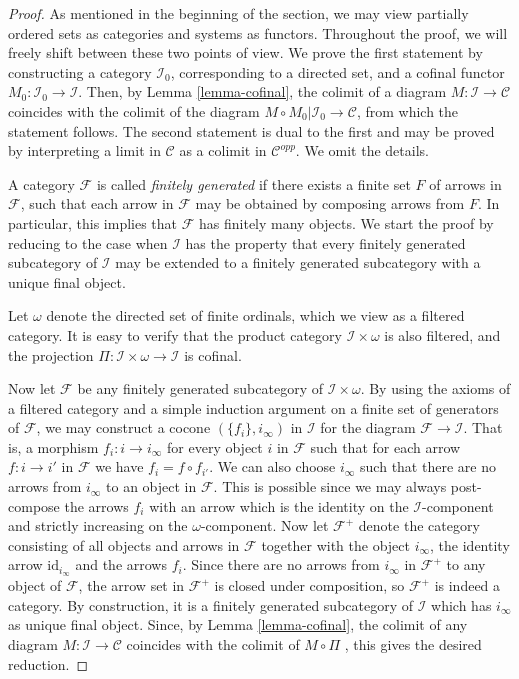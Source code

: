 \begin{proof}
As mentioned in the beginning of the section, we may view
partially ordered sets as categories and systems as functors.
Throughout the proof, we will freely shift between these two points
of view.
We prove the first statement by constructing a category
$\mathcal{I}_0$, corresponding to a directed set, and a cofinal
functor $M_0 : \mathcal{I}_0 \to \mathcal{I}$. Then, by
Lemma \ref{lemma-cofinal}, the colimit of a diagram
$M : \mathcal{I} \to \mathcal{C}$ coincides with the
colimit of the diagram $M \circ M_0 | \mathcal{I}_0 \to \mathcal{C}$,
from which the statement follows. The second statement is dual to the
first and may be proved by interpreting a limit in $\mathcal{C}$ as
a colimit in $\mathcal{C}^{opp}$. We omit the details.

\medskip\noindent
A category $\mathcal{F}$ is called {\em finitely generated} if
there exists a finite set $F$ of arrows in $\mathcal{F}$, such that
each arrow in $\mathcal{F}$ may be obtained by composing
arrows from $F$. In particular, this implies that $\mathcal{F}$ has
finitely many objects. We start the proof by reducing to the case
when $\mathcal{I}$ has the property that every finitely generated
subcategory of $\mathcal{I}$ may be extended to a finitely
generated subcategory with a unique final object.

\medskip\noindent
Let $\omega$ denote the directed set of finite ordinals, which
we view as a filtered category. It is easy to verify that the
product category $\mathcal{I}\times \omega$ is also filtered,
and the projection
$\Pi : \mathcal{I} \times \omega \to \mathcal{I}$
is cofinal.

\medskip\noindent
Now let $\mathcal{F}$ be any finitely generated
subcategory of $\mathcal{I}\times \omega$.
By using the axioms of a filtered category and a simple induction
argument on a finite set of generators of $\mathcal{F}$,
we may construct a cocone $(\{f_i\}, i_\infty)$ in $\mathcal{I}$
for the diagram $\mathcal{F} \to \mathcal{I}$. That is, a morphism
$f_i : i \to i_\infty$ for every object $i$ in $\mathcal{F}$
such that for each arrow $f : i \to i'$ in $\mathcal{F}$
we have $f_i = f\circ f_{i'}$. We can also choose $i_\infty$ such
that there are no arrows from $i_\infty$ to an object in $\mathcal{F}$.
This is possible since
we may always post-compose the arrows $f_i$ with an arrow
which is the identity on the $\mathcal{I}$-component and
strictly increasing on the $\omega$-component.
Now let $\mathcal{F}^+$ denote the category consisting of all
objects and arrows in $\mathcal{F}$
together with the object $i_\infty$, the identity
arrow $\text{id}_{i_\infty}$ and the arrows $f_i$.
Since there are no arrows from $i_\infty$ in $\mathcal{F}^+$
to any object of $\mathcal{F}$, the arrow set in $\mathcal{F}^+$
is closed under composition, so $\mathcal{F}^+$ is indeed
a category. By construction, it is a finitely
generated subcategory of $\mathcal{I}$ which has $i_\infty$ as
unique final object. Since, by Lemma \ref{lemma-cofinal},
the colimit of  any diagram $M : \mathcal{I} \to \mathcal{C}$
coincides with the colimit of $M\circ\Pi$ , this gives the desired
reduction.


\end{proof}
